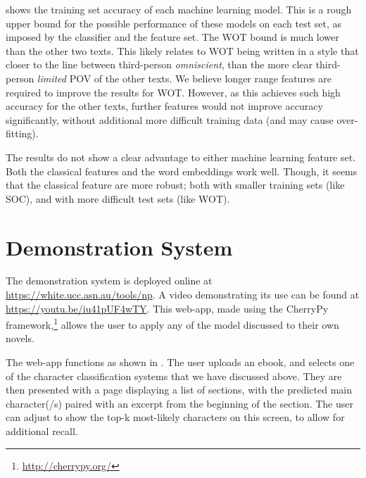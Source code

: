 \documentclass[11pt,a4paper]{article}
\begin{document}
 shows the training set accuracy of each machine learning model.
This is a rough upper bound for the possible performance of these models on each test set, as imposed by the classifier and the feature set.
The WOT bound is much lower than the other two texts.
This likely relates to WOT being written in a style that closer to the line between third-person \emph{omniscient}, than the more clear third-person \emph{limited} POV of the other texts.
We believe longer range features are required to improve the results for WOT.
However, as this achieves such high accuracy for the other texts, further features would not improve accuracy significantly, without additional more difficult training data (and may cause over-fitting).

%
%
The results do not show a clear advantage to either machine learning feature set.
Both the classical features and the word embeddings work well.
Though, it seems that the classical feature are more robust; both with smaller training sets (like SOC), and with more difficult test sets (like WOT).

\section{Demonstration System}\label{sec:demonstration}
The demonstration system is deployed online at \mbox{\url{https://white.ucc.asn.au/tools/np}}.
A video demonstrating its use can be found at \url{https://youtu.be/iu41pUF4wTY}.
This web-app, made using the CherryPy framework,\footnote{\url{http://cherrypy.org/}}
allows the user to apply any of the model discussed to their own novels.

The web-app functions as shown in .
The user uploads an ebook, and selects one of the character classification systems that we have discussed above.
They are then presented with a page displaying a list of sections,
with the predicted main character(/s) paired with an excerpt from the beginning of the section.
The user can adjust to show the top-k most-likely characters on this screen, to allow for additional recall.
\end{document}
